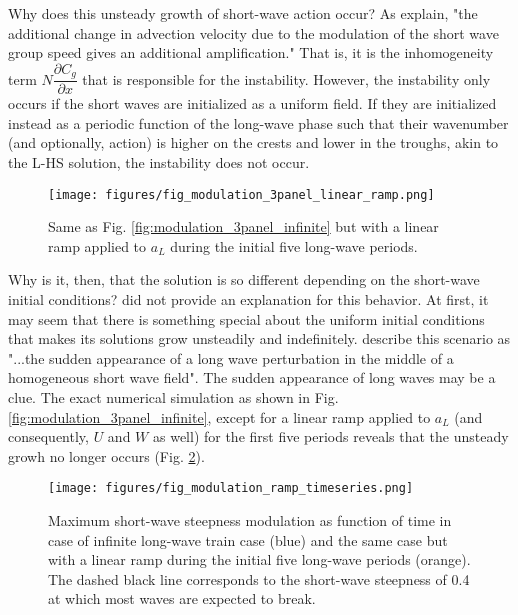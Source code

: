 \documentclass[draft]{agujournal2019}
\begin{document}
Why does this unsteady growth of short-wave action occur?
As  explain, "the additional change in advection
velocity due to the modulation of the short wave group speed gives an additional
amplification."
That is, it is the inhomogeneity term $N \dfrac{\partial C_g}{\partial x}$ that
is responsible for the instability.
However, the instability only occurs if the short waves are initialized as a
uniform field.
If they are initialized instead as a periodic function of the long-wave phase
such that their wavenumber (and optionally, action) is higher on the crests
and lower in the troughs, akin to the L-HS solution, the instability does not
occur.

\begin{figure}[h]
\label{fig:modulation_3panel_ramp}
\centering
\texttt{[image: figures/fig\_modulation\_3panel\_linear\_ramp.png]}
\caption{
  Same as Fig. \ref{fig:modulation_3panel_infinite} but with a linear ramp
  applied to $a_L$ during the initial five long-wave periods.
}
\end{figure}

Why is it, then, that the solution is so different depending on the short-wave
initial conditions?
 did not provide an explanation for this behavior.
At first, it may seem that there is something special about the uniform initial
conditions that makes its solutions grow unsteadily and indefinitely.
 describe this scenario as "...the sudden appearance
of a long wave perturbation in the middle of a homogeneous short wave field".
The sudden appearance of long waves may be a clue.
The exact numerical simulation as shown in Fig. \ref{fig:modulation_3panel_infinite},
except for a linear ramp applied to $a_L$ (and consequently, $U$ and $W$ as well)
for the first five periods reveals that the unsteady growh no longer occurs
(Fig. \ref{fig:modulation_3panel_ramp}).

\begin{figure}[h]
  \label{fig:modulation_3panel_ramp}
  \centering
  \texttt{[image: figures/fig\_modulation\_ramp\_timeseries.png]}
  \caption{
    Maximum short-wave steepness modulation as function of time in case of
    infinite long-wave train case (blue) and the same case but with a linear
    ramp during the initial five long-wave periods (orange). The dashed black
    line corresponds to the short-wave steepness of 0.4 at which most waves are
    expected to break.
  }
  \end{figure}
\end{document}
